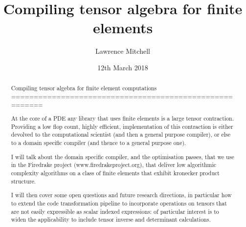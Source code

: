 \documentclass[presentation]{beamer}
\date{12th March 2018}
\title{Compiling tensor algebra for finite elements}
\author{Lawrence Mitchell\inst{1,*}}
\institute{
\inst{1}Department\textbf{s} of Computing and Mathematics, Imperial College
London

\inst{*}\texttt{lawrence.mitchell@imperial.ac.uk}
}
\begin{document}
\begin{frame}
  \maketitle
\end{frame}

\begin{abstract}
  Compiling tensor algebra for finite element computations
  ========================================================

  At the core of a PDE any library that uses finite elements is a
  large tensor contraction.  Providing a low flop count, highly
  efficient, implementation of this contraction is either devolved to
  the computational scientist (and then a general purpose compiler),
  or else to a domain specific compiler (and thence to a general
  purpose one).

  I will talk about the domain specific compiler, and the optimisation
  passes, that we use in the Firedrake project
  (www.firedrakeproject.org), that deliver low algorithmic
  complexity algorithms on a class of finite elements that exhibit
  kronecker product structure.

  I will then cover some open questions and future research
  directions, in particular how to extend the code transformation
  pipeline to incorporate operations on tensors that are not easily
  expressible as scalar indexed expressions: of particular interest is
  to widen the applicability to include tensor inverse and determinant
  calculations.
\end{abstract}
\end{document}
